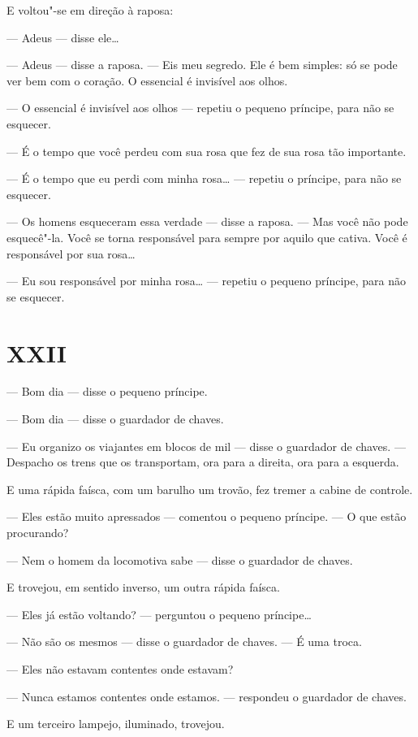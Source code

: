 \begin{Parallel}[p]{}{}
{E voltou"-se em direção à raposa:

--- Adeus --- disse ele\ldots{}

--- Adeus --- disse a raposa. --- Eis meu segredo. Ele é bem simples: só se
pode ver bem com o coração. O essencial é invisível aos olhos.

--- O essencial é invisível aos olhos --- repetiu o pequeno príncipe, para
não se esquecer.

--- É o tempo que você perdeu com sua rosa que fez de sua rosa tão
importante.

--- É o tempo que eu perdi com minha rosa\ldots{} --- repetiu o príncipe, para
não se esquecer.

--- Os homens esqueceram essa verdade --- disse a raposa. --- Mas você não
pode esquecê"-la. Você se torna responsável para sempre por aquilo que
cativa. Você é responsável por sua rosa\ldots{}

--- Eu sou responsável por minha rosa\ldots{} --- repetiu o pequeno príncipe,
para não se esquecer.

\section{XXII}

--- Bom dia --- disse o pequeno príncipe.

--- Bom dia --- disse o guardador de chaves.

--- Eu organizo os viajantes em blocos de mil --- disse o guardador de
chaves. --- Despacho os trens que os transportam, ora para a direita, ora
para a esquerda.

E uma rápida faísca, com um barulho um trovão, fez tremer a cabine de
controle.

--- Eles estão muito apressados --- comentou o pequeno príncipe. --- O que
estão procurando?

--- Nem o homem da locomotiva sabe --- disse o guardador de chaves.

E trovejou, em sentido inverso, um outra rápida faísca.

--- Eles já estão voltando? --- perguntou o pequeno príncipe\ldots{}

--- Não são os mesmos --- disse o guardador de chaves. --- É uma troca.

--- Eles não estavam contentes onde estavam?

--- Nunca estamos contentes onde estamos. --- respondeu o guardador de
chaves.

E um terceiro lampejo, iluminado, trovejou.

}
\end{Parallel}
